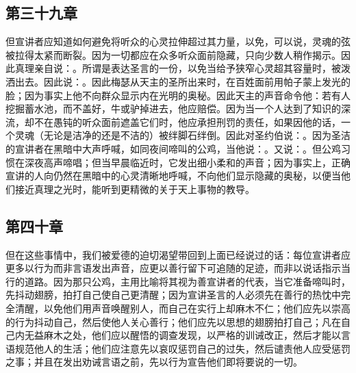 
\subsection{第三十九章}

\par

但宣讲者应知道如何避免将听众的心灵拉伸超过其力量，以免，可以说，灵魂的弦被拉得太紧而断裂。因为一切都应在众多听众面前隐藏，只向少数人稍作揭示。因此真理亲自说：。所谓是表达圣言的一份，以免当给予狭窄心灵超其容量时，被泼洒出去。因此说：。因此梅瑟从天主的圣所出来时，在百姓面前用帕子蒙上发光的脸；因为事实上他不向群众显示内在光明的奥秘。因此天主的声音命令他：若有人挖掘蓄水池，而不盖好，牛或驴掉进去，他应赔偿。因为当一个人达到了知识的深流，却不在愚钝的听众面前遮盖它们时，他应承担刑罚的责任，如果因他的话，一个灵魂（无论是洁净的还是不洁的）被绊脚石绊倒。因此对圣约伯说：。因为圣洁的宣讲者在黑暗中大声呼喊，如同夜间啼叫的公鸡，当他说：。又说：。但公鸡习惯在深夜高声啼唱；但当早晨临近时，它发出细小柔和的声音；因为事实上，正确宣讲的人向仍然在黑暗中的心灵清晰地呼喊，不向他们显示隐藏的奥秘，以便当他们接近真理之光时，能听到更精微的关于天上事物的教导。\par


\subsection{第四十章}

\par

但在这些事情中，我们被爱德的迫切渴望带回到上面已经说过的话：每位宣讲者应更多以行为而非言语发出声音，应更以善行留下可追随的足迹，而非以说话指示当行的道路。因为那只公鸡，主用比喻将其视为善宣讲者的代表，当它准备啼叫时，先抖动翅膀，拍打自己使自己更清醒；因为宣讲圣言的人必须先在善行的热忱中完全清醒，以免他们用声音唤醒别人，而自己在实行上却麻木不仁；他们应先以崇高的行为抖动自己，然后使他人关心善行；他们应先以思想的翅膀拍打自己；凡在自己内无益麻木之处，他们应以醒悟的调查发现，以严格的训诫改正，然后才能以言语规范他人的生活；他们应注意先以哀叹惩罚自己的过失，然后谴责他人应受惩罚之事；并且在发出劝诫言语之前，先以行为宣告他们即将要说的一切。\par

